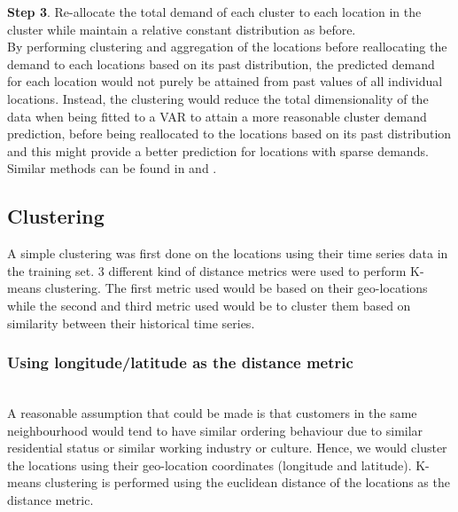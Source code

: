\documentclass[nonblindrev,msom]{informs3} %
\begin{document}
\noindent \textbf{Step 3}. Re-allocate the total demand of each cluster to each location in the cluster while maintain a relative constant distribution as before. \\







\noindent By performing clustering and aggregation of the locations before reallocating the demand to each locations based on its past distribution, the predicted demand for each location would not purely be attained from past values of all individual locations. Instead, the clustering would reduce the total dimensionality of the data when being fitted to a VAR to attain a more reasonable cluster demand prediction, before being reallocated to the locations based on its past distribution and this might provide a better prediction for locations with sparse demands. Similar methods can be found in \cite{Paul2015} and \cite{Chi2014}.

\noindent 
\subsection{Clustering}

A simple clustering was first done on the locations using their time series data in the training set. 3 different kind of distance metrics were used to perform K-means clustering. The first metric used would be based on their geo-locations while the second and third metric used would be to cluster them based on similarity between their historical time series. 

\subsubsection{Using longitude/latitude as the distance metric}
\hfill\\
A reasonable assumption that could be made is that customers in the same neighbourhood would tend to have similar ordering behaviour due to similar residential status or similar working industry or culture. Hence, we would cluster the locations using their geo-location coordinates (longitude and latitude). K-means clustering is performed using the euclidean distance of the locations as the distance metric.   
\end{document}
